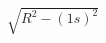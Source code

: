 \documentclass[preview]{standalone}
\begin{document}
\begin{align*}
\sqrt{R^2 - (1s)^2}
\end{align*}
\end{document}
